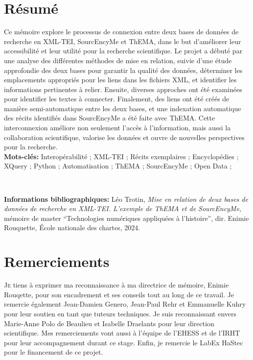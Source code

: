 \documentclass[a4paper,12pt,twoside]{book} %
\begin{document}
	\chapter{Résumé}
\medskip
	Ce mémoire explore le processus de connexion entre deux bases de données de recherche en XML-TEI, SourcEncyMe et ThEMA, dans le but d'améliorer leur accessibilité et leur utilité pour la recherche scientifique. Le projet a débuté par une analyse des différentes méthodes de mise en relation, suivie d'une étude approfondie des deux bases pour garantir la qualité des données, déterminer les emplacements appropriés pour les liens dans les fichiers XML, et identifier les informations pertinentes à relier. Ensuite, diverses approches ont été examinées pour identifier les textes à connecter. Finalement, des liens ont été créés de manière semi-automatique entre les deux bases, et une indexation automatique des récits identifiés dans SourcEncyMe a été faite avec ThEMA. Cette interconnexion améliore non seulement l'accès à l'information, mais aussi la collaboration scientifique, valorise les données et ouvre de nouvelles perspectives pour la recherche.\\
	
	\textbf{Mots-clés:} Interopérabilité ; XML-TEI ; Récits exemplaires ; Encyclopédies ; XQuery ; Python ; Automatisation ; ThEMA ; SourcEncyMe ; Open Data ;
	
	\
	
	\textbf{Informations bibliographiques:} Léo Trotin, \textit{Mise en relation de deux bases de données de recherche en XML-TEI. L'exemple de ThEMA et de SourcEncyMe}, mémoire de master \enquote{Technologies numériques appliquées à l'histoire}, dir. Enimie Rouquette, École nationale des chartes, 2024.
	
		\newpage{\pagestyle{empty}\cleardoublepage}
	
	\chapter{Remerciements}
	
\lettrine{J}e tiens à exprimer ma reconnaissance à ma directrice de mémoire, Enimie Rouqette, pour son encadrement et ses conseils tout au long de ce travail. Je remercie également Jean-Damien Genero, Jean-Paul Rehr et Emmanuelle Kuhry pour leur soutien en tant que tuteurs techniques. Je suis reconnaissant envers Marie-Anne Polo de Beaulieu et Isabelle Draelants pour leur direction scientifique. Mes remerciements vont aussi à l’équipe de l’EHESS et de l’IRHT pour leur accompagnement durant ce stage. Enfin, je remercie le LabEx HaStec pour le financement de ce projet.
\end{document}
